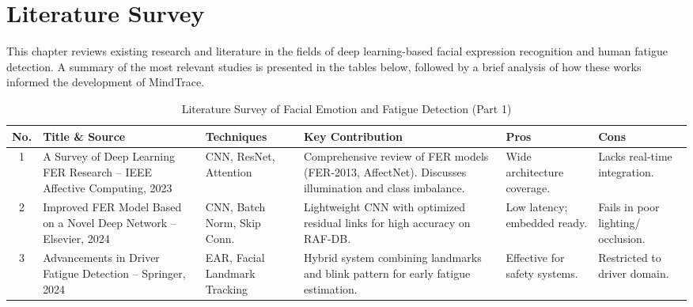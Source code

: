 \chapter{Literature Survey}

This chapter reviews existing research and literature in the fields of deep
learning-based facial expression recognition and human fatigue detection. A
summary of the most relevant studies is presented in the tables below,
followed by a brief analysis of how these works informed the development of
MindTrace.

\begin{table}[H]
\centering
\caption{Literature Survey of Facial Emotion and Fatigue Detection (Part 1)}
\label{tab:lit_survey_1}
\renewcommand{\arraystretch}{1.5}
\begin{tabularx}{\textwidth}{|c|X|p{2.5cm}|X|p{2cm}|p{2cm}|}
\hline
\textbf{No.} & \textbf{Title \& Source} & \textbf{Techniques} & \textbf{Key Contribution} & \textbf{Pros} & \textbf{Cons} \\
\hline
1 & A Survey of Deep Learning FER Research -- IEEE Affective Computing, 2023 & CNN, ResNet, Attention & Comprehensive review of FER models (FER-2013, AffectNet). Discusses illumination and class imbalance. & Wide architecture coverage. & Lacks real-time integration. \\
\hline
2 & Improved FER Model Based on a Novel Deep Network -- Elsevier, 2024 & CNN, Batch Norm, Skip Conn. & Lightweight CNN with optimized residual links for high accuracy on RAF-DB. & Low latency; embedded ready. & Fails in poor lighting/ occlusion. \\
\hline
3 & Advancements in Driver Fatigue Detection -- Springer, 2024 & EAR, Facial Landmark Tracking & Hybrid system combining landmarks and blink pattern for early fatigue estimation. & Effective for safety systems. & Restricted to driver domain. \\
\hline
\end{tabularx}
\end{table}

\newpage

